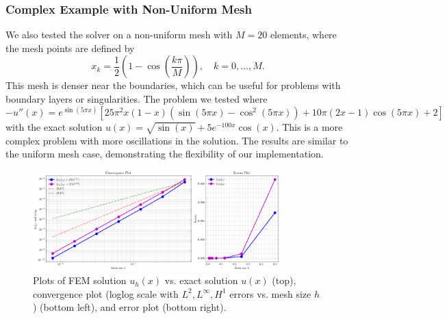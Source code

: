 \documentclass[a4paper,10pt]{article}
\begin{document}
\subsubsection*{Complex Example with Non-Uniform Mesh}
We also tested the solver on a non-uniform mesh with $M=20$ elements, where the mesh points are defined by
\[
	x_k = \frac{1}{2}\left(1-\cos\left(\frac{k\pi}{M}\right)\right), \quad k=0,\ldots,M.
\]
This mesh is denser near the boundaries, which can be useful for problems with boundary layers or singularities. 
The problem we tested where
\[
	-u''(x) = e^{\sin(5\pi x)}\left[25\pi^2 x(1-x)(\sin(5\pi x) - \cos^2(5\pi x)) + 10\pi (2x-1)\cos(5\pi x) + 2\right]
\]
with the exact solution
\(
	u(x) =\sqrt{\sin(x)} + 5e^{-100x}\cos(x).
\)
This is a more complex problem with more oscillations in the solution.
The results are similar to the uniform mesh case, demonstrating the flexibility of our implementation.
\begin{figure}[H]
	\centering
	\includegraphics[width=0.85\textwidth]{figures/convergence_complex_M20.png}
	\caption{Plots of FEM solution \(u_h(x)\) vs. exact solution \(u(x)\) (top),
		convergence plot (loglog scale with $L^2, L^\infty, H^1$ errors vs. mesh size $h$) (bottom left),
		and error plot (bottom right).}
	\label{fig:solution_complex}
\end{figure}
\end{document}
